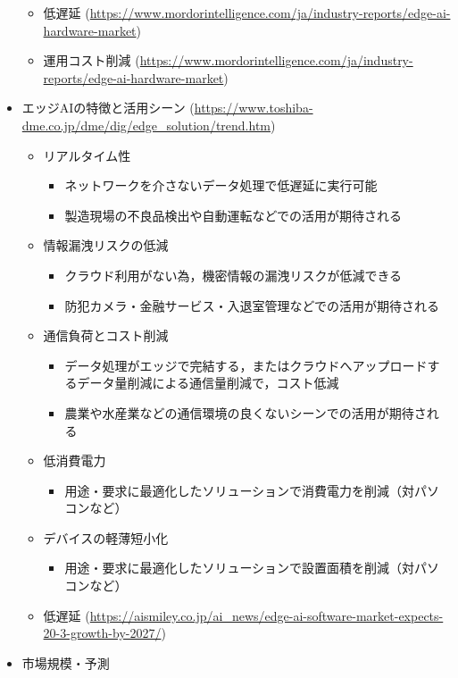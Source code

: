 \begin{itemize}
\begin{itemize}
		\item 低遅延 (\url{https://www.mordorintelligence.com/ja/industry-reports/edge-ai-hardware-market})
		\item 運用コスト削減 (\url{https://www.mordorintelligence.com/ja/industry-reports/edge-ai-hardware-market})
	\end{itemize}
	\item エッジAIの特徴と活用シーン (\url{https://www.toshiba-dme.co.jp/dme/dig/edge_solution/trend.htm})
	\begin{itemize}
		\item リアルタイム性
		\begin{itemize}
			\item ネットワークを介さないデータ処理で低遅延に実行可能
			\item 製造現場の不良品検出や自動運転などでの活用が期待される
		\end{itemize}
		\item 情報漏洩リスクの低減
		\begin{itemize}
			\item クラウド利用がない為，機密情報の漏洩リスクが低減できる
			\item 防犯カメラ・金融サービス・入退室管理などでの活用が期待される
		\end{itemize}
		\item 通信負荷とコスト削減
		\begin{itemize}
			\item データ処理がエッジで完結する，またはクラウドへアップロードするデータ量削減による通信量削減で，コスト低減
			\item 農業や水産業などの通信環境の良くないシーンでの活用が期待される
		\end{itemize}
		\item 低消費電力
		\begin{itemize}
			\item 用途・要求に最適化したソリューションで消費電力を削減（対パソコンなど）
		\end{itemize}
		\item デバイスの軽薄短小化
		\begin{itemize}
			\item 用途・要求に最適化したソリューションで設置面積を削減（対パソコンなど）
		\end{itemize}
		\item 低遅延 (\url{https://aismiley.co.jp/ai_news/edge-ai-software-market-expects-20-3-growth-by-2027/})
	\end{itemize}
	\item 市場規模・予測

\end{itemize}
